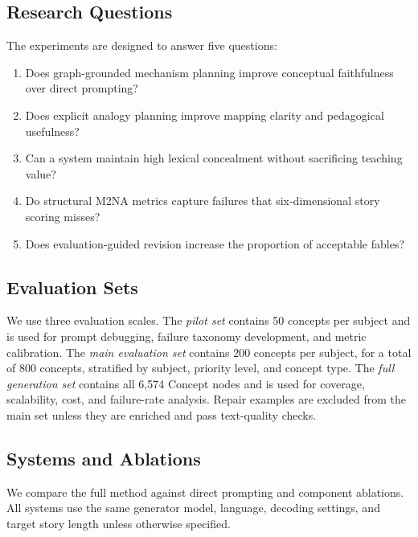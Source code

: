 \documentclass[letterpaper]{article} %
\begin{document}
\subsection{Research Questions}

The experiments are designed to answer five questions:
\begin{enumerate}
\item Does graph-grounded mechanism planning improve conceptual faithfulness over direct prompting?
\item Does explicit analogy planning improve mapping clarity and pedagogical usefulness?
\item Can a system maintain high lexical concealment without sacrificing teaching value?
\item Do structural M2NA metrics capture failures that six-dimensional story scoring misses?
\item Does evaluation-guided revision increase the proportion of acceptable fables?
\end{enumerate}

\subsection{Evaluation Sets}

We use three evaluation scales. The \emph{pilot set} contains 50 concepts per subject and is used for prompt debugging, failure taxonomy development, and metric calibration. The \emph{main evaluation set} contains 200 concepts per subject, for a total of 800 concepts, stratified by subject, priority level, and concept type. The \emph{full generation set} contains all 6,574 Concept nodes and is used for coverage, scalability, cost, and failure-rate analysis. Repair examples are excluded from the main set unless they are enriched and pass text-quality checks.

\subsection{Systems and Ablations}

We compare the full method against direct prompting and component ablations. All systems use the same generator model, language, decoding settings, and target story length unless otherwise specified.
\end{document}
